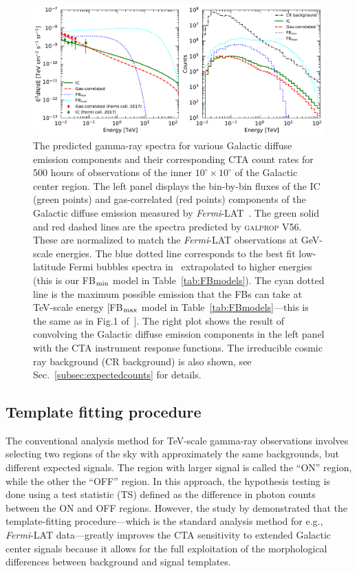 \documentclass[doublespace,nopageskip]{VTthesis} %
\begin{document}
\begin{figure}[htb]
    \centering
    \includegraphics[width=\textwidth]{Figures/CTA/spectra-and-counts.pdf}
    \caption{The predicted gamma-ray spectra for various Galactic diffuse emission components and their corresponding CTA count rates for 500 hours of observations of the inner $10^\circ \times 10^\circ$ of the Galactic center region. The left panel displays the bin-by-bin fluxes of the IC (green points) and gas-correlated (red points) components of the Galactic diffuse emission measured by \textit{Fermi}-LAT~\citep{TheFermi-LAT:2017vmf}. The green solid and red dashed lines are the spectra predicted by \textsc{galprop V56}. These are normalized to match the \textit{Fermi}-LAT observations at GeV-scale energies. The blue dotted line corresponds to the best fit low-latitude Fermi bubbles spectra in~\citep{TheFermi-LAT:2017vmf} extrapolated to higher energies (this is our FB$_{\rm min}$ model in Table~\ref{tab:FBmodels}). The cyan dotted line is the maximum possible emission that the FBs can take at TeV-scale energy [FB$_{\rm max}$ model in Table~\ref{tab:FBmodels}---this is the same as in Fig.1 of~\citet{Rinchiuso:2020skh}]. The right plot shows the result of convolving the Galactic diffuse emission components in the left panel with the CTA instrument response functions. The irreducible cosmic ray background (CR background) is also shown, see Sec.~\ref{subsec:expectedcounts} for details.}
    \label{fig:counts_spectra}
\end{figure}

\subsection{Template fitting procedure}
\label{sub:templatefitting}

The conventional analysis method for TeV-scale gamma-ray observations involves selecting two regions of the sky with approximately the same backgrounds, 
but different expected signals. The region with larger signal is called the ``ON'' region, while the other the ``OFF'' region. In this approach, the hypothesis testing is done using a test statistic (TS) defined as the difference in photon counts between the ON and OFF regions. However, the study by \cite{Silverwood:2014yza} demonstrated that the template-fitting procedure---which is the standard analysis method for e.g., \textit{Fermi}-LAT data---greatly improves the CTA sensitivity to extended Galactic center signals because it allows for the full exploitation of the morphological differences between background and signal templates. 
\end{document}

